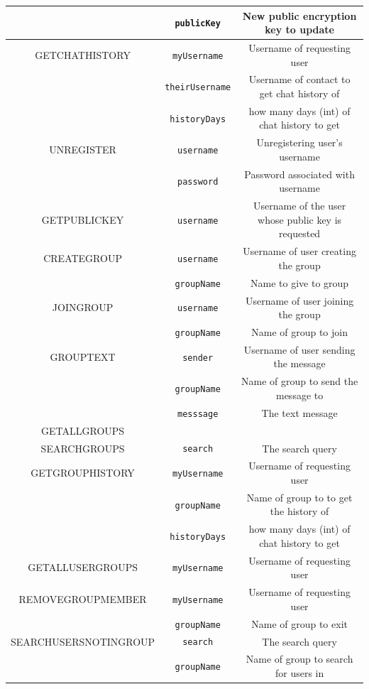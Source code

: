 \begin{table}[H]
\begin{tabular}{ |c|c|c| }
 &\verb|publicKey|& New public encryption key to update \\  
  \hline
 GETCHATHISTORY & \verb|myUsername| & Username of requesting user  \\ 
 &\verb|theirUsername|& Username of contact to get chat history of \\
 &\verb|historyDays|& how many days (int) of chat history to get \\  
  \hline
 UNREGISTER & \verb|username| & Unregistering user's username  \\ 
  &\verb|password|& Password associated with username \\ 
 \hline
 GETPUBLICKEY & \verb|username| & Username of the user whose public key is requested \\ 
  \hline
 CREATEGROUP & \verb|username| & Username of user creating the group  \\ 
   & \verb|groupName| & Name to give to group \\ 
  \hline
 JOINGROUP & \verb|username| & Username of user joining the group  \\ 
   & \verb|groupName| & Name of group to join \\ 
  \hline
 GROUPTEXT & \verb|sender| & Username of user sending the message \\ 
 &\verb|groupName|& Name of group to send the message to \\
 &\verb|messsage|& The text message \\  
  \hline
 GETALLGROUPS &  &   \\ 
  \hline
 SEARCHGROUPS & \verb|search| & The search query  \\ 
 \hline
  GETGROUPHISTORY & \verb|myUsername| & Username of requesting user \\ 
 &\verb|groupName|& Name of group to to get the history of \\
 &\verb|historyDays|& how many days (int) of chat history to get \\  
  \hline
  GETALLUSERGROUPS & \verb|myUsername| & Username of requesting user \\ 
  \hline
  REMOVEGROUPMEMBER & \verb|myUsername| & Username of requesting user \\ 
 &\verb|groupName|& Name of group to exit \\  
  \hline
  SEARCHUSERSNOTINGROUP & \verb|search| & The search query \\ 
 &\verb|groupName|& Name of group to search for users in \\  
  \hline
\end{tabular}
\end{table}




